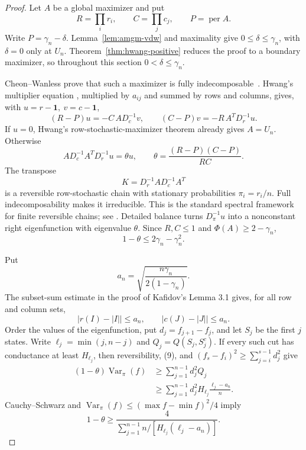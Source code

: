 \documentclass[11pt]{amsart}
\theoremstyle{definition}
\theoremstyle{remark}
\begin{document}
\begin{proof}
Let \(A\) be a global maximizer and put
\[
 R=\prod_i r_i,\qquad C=\prod_jc_j,\qquad P=\operatorname{per}A.
\]
Write \(P=\gamma_n-\delta\).  Lemma~\ref{lem:amgm-vdw} and maximality
give \(0\leq\delta\leq\gamma_n\), with \(\delta=0\) only at \(U_n\).
Theorem~\ref{thm:hwang-positive} reduces the proof to a boundary maximizer,
so throughout this section \(0<\delta\leq\gamma_n\).

Cheon--Wanless prove that such a maximizer is fully
indecomposable~\cite[Theorem 3.2]{CW}. Hwang's multiplier equation
\cite[Lemmas 3.5--3.6]{CW}, multiplied by \(a_{ij}\) and summed by rows and
columns, gives, with \(u=r-\mathbf1,\ v=c-\mathbf1\),
\[
 (R-P)u=-C\,AD_c^{-1}v,\qquad
 (C-P)v=-R\,A^TD_r^{-1}u.                          \tag{6}
\]
If \(u=0\), Hwang's row-stochastic-maximizer theorem already gives \(A=U_n\).
Otherwise
\[
 AD_c^{-1}A^TD_r^{-1}u=\theta u,\qquad
 \theta=\frac{(R-P)(C-P)}{RC}.                     \tag{7}
\]
The transpose
\[
 \widehat K=D_r^{-1}AD_c^{-1}A^T
\]
is a reversible row-stochastic chain with stationary probabilities
\(\pi_i=r_i/n\). Full indecomposability makes it irreducible.  This is the standard
spectral framework for finite reversible chains; see \cite{LevinPeres}.
Detailed balance turns \(D_\pi^{-1}u\) into a nonconstant right eigenfunction with
eigenvalue \(\theta\). Since \(R,C\leq1\) and
\(\Phi(A)\geq2-\gamma_n\),
\[
 1-\theta\leq2\gamma_n-\gamma_n^2.                 \tag{8}
\]

Put
\[
 a_n=\sqrt{\frac{n\gamma_n}{2(1-\gamma_n)}}.
\]
The subset-sum estimate in the proof of Kafidov's Lemma 3.1 gives, for all
row and column sets,
\[
 |r(I)-|I||\leq a_n,\qquad |c(J)-|J||\leq a_n.      \tag{9}
\]
Order the values of the eigenfunction, put \(d_j=f_{j+1}-f_j\), and let
\(S_j\) be the first \(j\) states. Write
\(\ell_j=\min(j,n-j)\) and \(Q_j=Q(S_j,S_j^c)\). If every such cut has
conductance at least \(H_{\ell_j}\), then reversibility, (9), and
\((f_s-f_i)^2\geq\sum_{j=i}^{s-1}d_j^2\) give
\[
\begin{split}
(1-\theta)\operatorname{Var}_\pi(f)
&\geq\sum_{j=1}^{n-1}d_j^2Q_j\\
&\geq\sum_{j=1}^{n-1}d_j^2
 H_{\ell_j}\frac{\ell_j-a_n}{n}.
\end{split}
\]
Cauchy--Schwarz and
\(\operatorname{Var}_\pi(f)\leq(\max f-\min f)^2/4\) imply
\[
1-\theta\geq
\frac4{\displaystyle\sum_{j=1}^{n-1}
 n/[H_{\ell_j}(\ell_j-a_n)]}.                      \tag{10}
\]


\end{proof}
\end{document}
